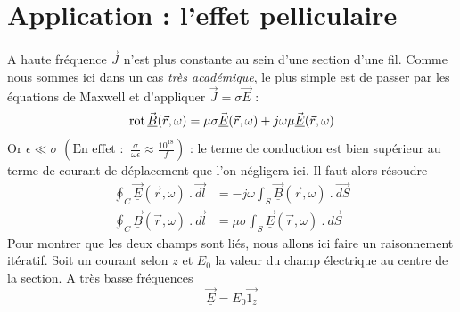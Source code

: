\section{Application : l'effet pelliculaire}
A haute fréquence $\vec{J}$ n'est plus constante au sein d'une section d'une fil. Comme nous 
sommes ici dans un cas \textit{très académique}, le plus simple est de passer par les équations 
de Maxwell et d'appliquer $\vec{J} =\sigma\vec{E}$ :
\begin{equation}
\rot\vec{\underline{B}}(\vec{r},\omega) = \mu\sigma\vec{\underline{E}}(\vec{r},\omega) + j\omega
\mu \vec{\underline{E}}(\vec{r},\omega)
\end{equation}
Or $\epsilon \ll \sigma$ $\left(\text{En effet : }\ \frac{\sigma}{\omega\epsilon}\approx\frac{10^{1
8}}{f}\right)$ : le terme de conduction est bien supérieur au terme de courant de déplacement 
que l'on négligera ici. Il faut alors résoudre
\begin{equation}
\begin{array}{ll}
\oint_C \vec{\underline{E}}(\vec{r},\omega)\ .\ \vec{dl} &= -j\omega\int_S \vec{\underline{B}}
(\vec{r},\omega)\ .\ \vec{dS}\\
\oint_C \vec{\underline{B}}(\vec{r},\omega)\ .\ \vec{dl} &= \mu\sigma\int_S \vec{\underline{E}}
(\vec{r},\omega)\ .\ \vec{dS}
\end{array}
\end{equation}
Pour montrer que les deux champs sont liés, nous allons ici faire un raisonnement itératif. 
Soit un courant selon $z$ et $E_0$ la valeur du champ électrique au centre de la section. A 
très basse fréquences
\begin{equation}
\vec{\underline{E}} = E_0\vec{1_z}
\end{equation}

